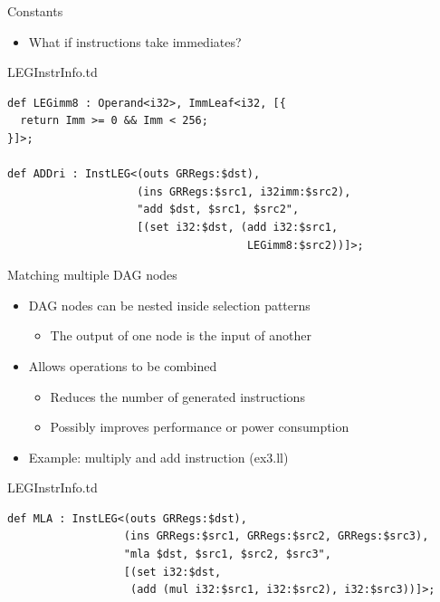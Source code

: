 
\begin{frame}[fragile]{Constants}

\begin{itemize}
    \item What if instructions take immediates?
\end{itemize}

\begin{block}{LEGInstrInfo.td}
\begin{lstlisting}
def LEGimm8 : Operand<i32>, ImmLeaf<i32, [{
  return Imm >= 0 && Imm < 256;
}]>;

def ADDri : InstLEG<(outs GRRegs:$dst),
                    (ins GRRegs:$src1, i32imm:$src2),
                    "add $dst, $src1, $src2",
                    [(set i32:$dst, (add i32:$src1, 
                                     LEGimm8:$src2))]>;
\end{lstlisting}
\end{block}


\end{frame}


\begin{frame}[fragile]{Matching multiple DAG nodes}

\begin{itemize}
    \item DAG nodes can be nested inside selection patterns
    \begin{itemize}
        \item The output of one node is the input of another
    \end{itemize}
    \item Allows operations to be combined
    \begin{itemize}
        \item Reduces the number of generated instructions
        \item Possibly improves performance or power consumption
    \end{itemize}
    \item Example: multiply and add instruction (ex3.ll)
\end{itemize}

\begin{block}{LEGInstrInfo.td}
\begin{lstlisting}
def MLA : InstLEG<(outs GRRegs:$dst),
                  (ins GRRegs:$src1, GRRegs:$src2, GRRegs:$src3),
                  "mla $dst, $src1, $src2, $src3",
                  [(set i32:$dst,
                   (add (mul i32:$src1, i32:$src2), i32:$src3))]>;
\end{lstlisting}
\end{block}

\end{frame}

